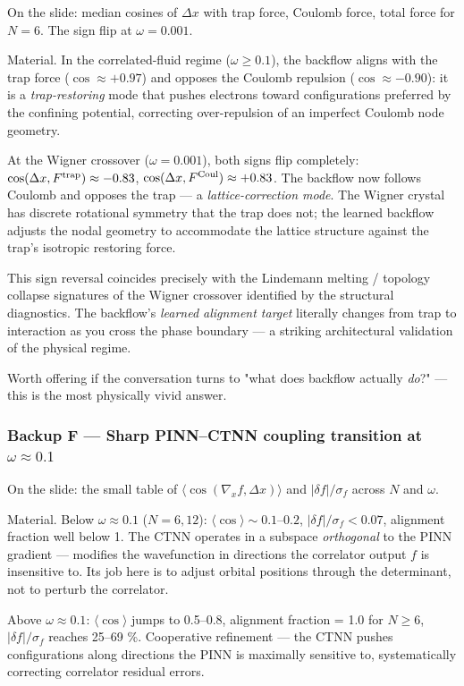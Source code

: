 \documentclass[11pt]{article}
\begin{document}
On the slide: median cosines of $\Delta x$ with trap force, Coulomb
force, total force for $N = 6$. The sign flip at $\omega = 0.001$.

Material. In the correlated-fluid regime ($\omega \ge 0.1$), the backflow
aligns with the trap force ($\cos \approx +0.97$) and opposes the
Coulomb repulsion ($\cos \approx -0.90$): it is a \emph{trap-restoring} mode
that pushes electrons toward configurations preferred by the confining
potential, correcting over-repulsion of an imperfect Coulomb node
geometry.

At the Wigner crossover ($\omega = 0.001$), both signs flip completely:
$\cos(\Delta x, F^{\rm trap}) \approx -0.83$, $\cos(\Delta x, F^{\rm Coul})
\approx +0.83$. The backflow now follows Coulomb and opposes the trap ---
a \emph{lattice-correction mode}. The Wigner crystal has discrete rotational
symmetry that the trap does not; the learned backflow adjusts the nodal
geometry to accommodate the lattice structure against the trap's
isotropic restoring force.

This sign reversal coincides precisely with the Lindemann melting /
topology collapse signatures of the Wigner crossover identified by the
structural diagnostics. The backflow's \emph{learned alignment target}
literally changes from trap to interaction as you cross the phase
boundary --- a striking architectural validation of the physical regime.

Worth offering if the conversation turns to "what does backflow actually
\emph{do}?" --- this is the most physically vivid answer.

\subsubsection*{Backup F --- Sharp PINN--CTNN coupling transition at $\omega \approx 0.1$}

On the slide: the small table of $\langle \cos(\nabla_x f, \Delta x)
\rangle$ and $|\delta f| / \sigma_f$ across $N$ and $\omega$.

Material. Below $\omega \approx 0.1$ ($N = 6, 12$): $\langle \cos \rangle
\sim 0.1$--$0.2$, $|\delta f|/\sigma_f < 0.07$, alignment fraction well
below 1. The CTNN operates in a subspace \emph{orthogonal} to the PINN
gradient --- modifies the wavefunction in directions the correlator output
$f$ is insensitive to. Its job here is to adjust orbital positions
through the determinant, not to perturb the correlator.

Above $\omega \approx 0.1$: $\langle \cos \rangle$ jumps to 0.5--0.8,
alignment fraction = 1.0 for $N \ge 6$, $|\delta f|/\sigma_f$ reaches
25--69 \%. Cooperative refinement --- the CTNN pushes configurations along
directions the PINN is maximally sensitive to, systematically correcting
correlator residual errors.
\end{document}
